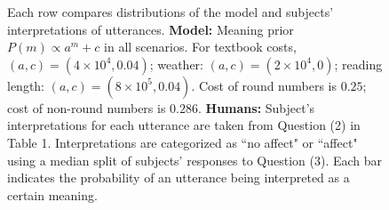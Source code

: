 \documentclass{article} %
\begin{document}
\begin{figure}[t]
\begin{subfigure}[b]{0.51\textwidth}
        \end{subfigure} 
        \caption{Each row compares distributions of the model and subjects' interpretations of utterances. \textbf{Model:} Meaning prior $P(m) \propto a^m + c$  in all scenarios. For textbook costs, $(a, c) = (4 \times 10^4, 0.04)$; weather: $(a, c) = (2 \times 10^4, 0)$; reading length: $(a, c) = (8 \times 10^5, 0.04)$. Cost of round numbers is $0.25$; cost of non-round numbers is $0.286$. \textbf{Humans:} Subject's interpretations for each utterance are taken from Question (2) in Table 1. Interpretations are categorized as ``no affect" or ``affect" using a median split of subjects' responses to Question (3). Each bar indicates the probability of an utterance being interpreted as a certain meaning.}
        \label{fig:results}
  \end{figure}



\clearpage

\small{

}
\end{document}
